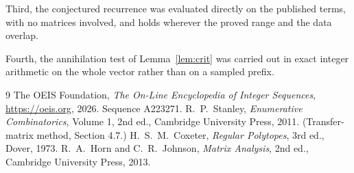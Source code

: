 \documentclass[11pt,a4paper]{article}
\theoremstyle{plain}
\theoremstyle{definition}
\begin{document}
Third, the conjectured recurrence was evaluated directly on the published terms, with no
matrices involved, and holds wherever the proved range and the data overlap.

Fourth, the annihilation test of Lemma~\ref{lem:crit} was carried out in exact integer
arithmetic on the whole vector rather than on a sampled prefix.

\begin{thebibliography}{9}
 The OEIS Foundation, \emph{The On-Line Encyclopedia of Integer
Sequences}, \url{https://oeis.org}, 2026. Sequence A223271.
 R.~P.~Stanley, \emph{Enumerative Combinatorics}, Volume 1, 2nd ed.,
Cambridge University Press, 2011. (Transfer-matrix method, Section 4.7.)
 H.~S.~M.~Coxeter, \emph{Regular Polytopes}, 3rd ed., Dover, 1973.
 R.~A.~Horn and C.~R.~Johnson, \emph{Matrix Analysis}, 2nd ed., Cambridge
University Press, 2013.
\end{thebibliography}
\end{document}
